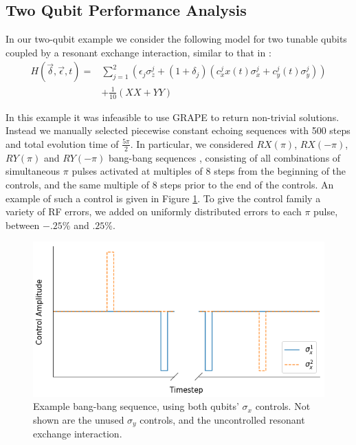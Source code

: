 \documentclass[aps,nofootinbib,pra,notitlepage,twocolumn]{revtex4-1}
\begin{document}
\subsection{Two Qubit Performance Analysis}
\label{two_qubit_performance}
In our two-qubit example we consider the following model for two tunable qubits coupled by a resonant exchange interaction, similar to that in \cite{McKay2016}:
\begin{equation} \label{eq:2Qham}
\begin{split}
H(\vec{\delta}, \vec{\epsilon}, t) = &\sum_{j=1}^2(\epsilon_j\sigma_z^j + (1 + \delta_j)(c_x^jx(t)\sigma_x^j + c_y^j(t)\sigma_y^j)) \\
&+ \frac{1}{10}(XX + YY)
\end{split}
\end{equation}

In this example it was infeasible to use GRAPE to return non-trivial solutions. Instead we manually selected piecewise constant echoing sequences with 500 steps and total evolution time of $\frac{5\pi}{2}$. In particular, we considered $RX(\pi)$, $RX(-\pi)$, $RY(\pi)$ and $RY(-\pi)$ bang-bang sequences \cite{bangbang}, consisting of all combinations of simultaneous $\pi$ pulses activated at multiples of $8$ steps from the beginning of the controls, and the same multiple of $8$ steps prior to the end of the controls. An example of such a control is given in Figure \ref{fig:bangbang}. To give the control family a variety of RF errors, we added on uniformly distributed errors to each $\pi$ pulse, between $-.25$\% and $.25$\%.


\begin{figure}
  \centering
  \includegraphics[width=\columnwidth]{bangbang.png}
  \caption{Example bang-bang sequence, using both qubits' $\sigma_x$ controls. Not shown are the unused $\sigma_y$ controls, and the uncontrolled resonant exchange interaction.}
  \label{fig:bangbang}
\end{figure}
\end{document}
